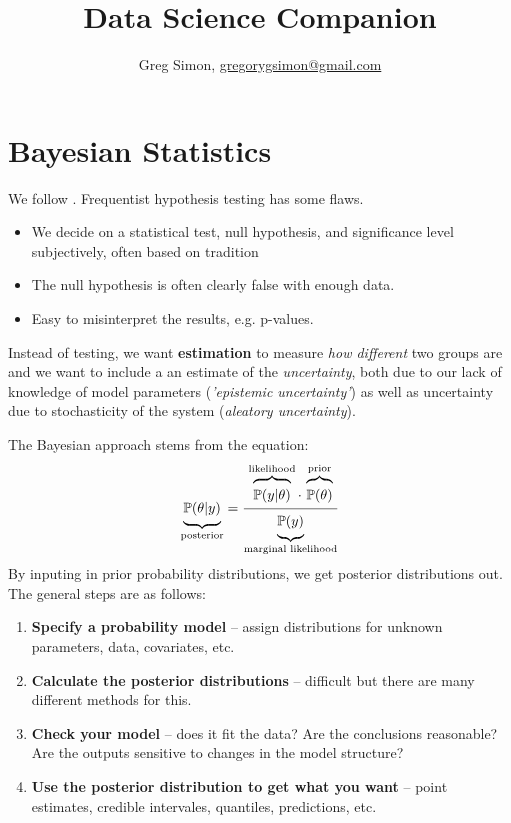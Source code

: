 \documentclass[12pt]{article}
\title{Data Science Companion}
\author{Greg Simon, \url{gregorygsimon@gmail.com}}
\newcommand{\mystrut}{\ensuremath{\vphantom{\sum}}}
\newcommand{\PP}{\ensuremath{\mathbb{P}}}
\begin{document}
\maketitle



\tableofcontents
\newpage



\section{Bayesian Statistics}
\newrefsection

We follow \cite{Fonnesbeck2019}. Frequentist hypothesis testing has some flaws.
\begin{itemize}
\item We decide on a statistical test, null hypothesis, and significance level
  subjectively, often based on tradition
\item The null hypothesis is often clearly false with enough data.
\item Easy to misinterpret the results, e.g. p-values.
\end{itemize}

Instead of testing, we want {\bf estimation} to measure {\sl how different} two
groups are and we want to include a an estimate of the {\sl uncertainty}, both
due to our lack of knowledge of model parameters ({\sl 'epistemic uncertainty'})
as well as uncertainty due to stochasticity of the system ({\sl aleatory
  uncertainty}). 

The Bayesian approach stems from the equation:
\begin{align*}
  \underbrace{\mystrut\PP(\theta|y)}_{\text{posterior}} =
  \frac{\overbrace{\mystrut\PP(y|\theta)}^{\text{likelihood}}\cdot\,\overbrace{\mystrut\PP(\theta)}^{\text{prior}}}
  {\underbrace{\mystrut\PP(y)}_{\text{marginal likelihood}}}
\end{align*}
By inputing in prior probability distributions, we get posterior distributions
out. The general steps are as follows:
\begin{enumerate}
\item {\bf Specify a probability model} -- assign distributions for unknown parameters,
  data, covariates, etc.
\item {\bf Calculate the posterior distributions} -- difficult but there are many
  different methods for this.
\item {\bf Check your model} -- does it fit the data? Are the conclusions reasonable? Are the outputs sensitive to changes in the model structure?
\item {\bf Use the posterior distribution to get what you want} -- point estimates,
  credible intervales, quantiles, predictions, etc.
\end{enumerate}
\end{document}
